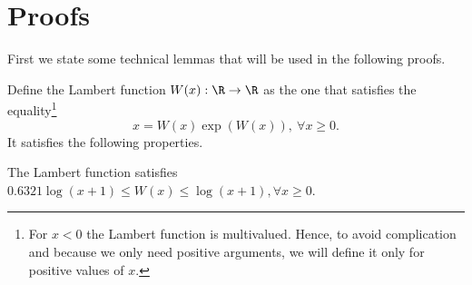 \appendix
\section{Proofs}
\label{sec:proofs}

First we state some technical lemmas that will be used in the following proofs.

Define the Lambert function $W(x):\R\rightarrow\R$ as the one that satisfies the equality\footnote{For $x<0$ the Lambert function is multivalued. Hence, to avoid complication and because we only need positive arguments, we will define it only for positive values of $x$.}
\begin{equation}
\label{eq:lambert}
x=W(x) \exp \left(W(x)\right), \ \forall x\geq0.
\end{equation}
It satisfies the following properties.
%
\begin{lemma}
The Lambert function satisfies $0.6321 \log(x+1) \leq W(x) \leq \log(x+1), \forall x\geq0$.
\end{lemma}
%
